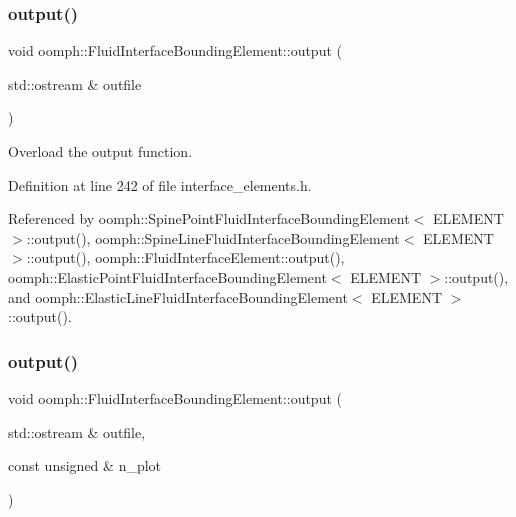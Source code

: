 \mbox{\label{classoomph_1_1FluidInterfaceBoundingElement_a81adc5ae89ddfa120f587c61b972622f}} 
\subsubsection{\texorpdfstring{output()}{output()}\hspace{0.1cm}{\footnotesize\ttfamily [1/4]}}
{\footnotesize\ttfamily void oomph\+::\+Fluid\+Interface\+Bounding\+Element\+::output (\begin{DoxyParamCaption}\item[{std\+::ostream \&}]{outfile }\end{DoxyParamCaption})\hspace{0.3cm}{\ttfamily [inline]}}



Overload the output function. 



Definition at line 242 of file interface\+\_\+elements.\+h.



Referenced by oomph\+::\+Spine\+Point\+Fluid\+Interface\+Bounding\+Element$<$ E\+L\+E\+M\+E\+N\+T $>$\+::output(), oomph\+::\+Spine\+Line\+Fluid\+Interface\+Bounding\+Element$<$ E\+L\+E\+M\+E\+N\+T $>$\+::output(), oomph\+::\+Fluid\+Interface\+Element\+::output(), oomph\+::\+Elastic\+Point\+Fluid\+Interface\+Bounding\+Element$<$ E\+L\+E\+M\+E\+N\+T $>$\+::output(), and oomph\+::\+Elastic\+Line\+Fluid\+Interface\+Bounding\+Element$<$ E\+L\+E\+M\+E\+N\+T $>$\+::output().

\mbox{\label{classoomph_1_1FluidInterfaceBoundingElement_af2c821d51d506221976a0c17e1615ac3}} 
\subsubsection{\texorpdfstring{output()}{output()}\hspace{0.1cm}{\footnotesize\ttfamily [2/4]}}
{\footnotesize\ttfamily void oomph\+::\+Fluid\+Interface\+Bounding\+Element\+::output (\begin{DoxyParamCaption}\item[{std\+::ostream \&}]{outfile,  }\item[{const unsigned \&}]{n\+\_\+plot }\end{DoxyParamCaption})\hspace{0.3cm}{\ttfamily [inline]}}



